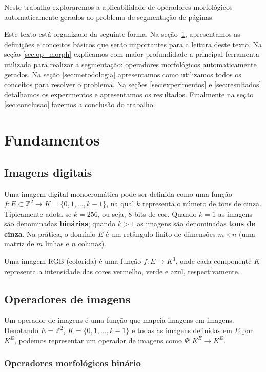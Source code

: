 \documentclass[a4paper,11pt]{article}
\begin{document}
Neste trabalho exploraremos a aplicabilidade de operadores
morfológicos automaticamente gerados ao problema de segmentação de
páginas.

Este texto está organizado da seguinte forma. Na seção~\ref{sec:fundamentos},
apresentamos as definições e conceitos básicos que serão importantes
para a leitura deste texto. Na seção \ref{sec:op_morph} explicamos com maior profundidade a principal ferramenta utilizada para realizar a segmentação: operadores morfológicos automaticamente gerados. Na seção \ref{sec:metodologia} apresentamos como utilizamos todos os conceitos para resolver o problema. Na seções \ref{sec:experimentos} e \ref{sec:resultados} detalhamos os experimentos e apresentamos os resultados. Finalmente na seção \ref{sec:conclusao} fazemos a conclusão do trabalho.

\clearpage

\section{Fundamentos}
\label{sec:fundamentos}

\subsection{Imagens digitais}
  Uma imagem digital monocromática pode ser definida como uma função $f:
  E \subset \mathbb{Z}^2 \to K = \{0,1,\ldots,k-1\}$, na qual $k$ representa o número de tons de cinza. Tipicamente adota-se $k=256$, ou seja, 8-bits de cor. Quando $k=1$ as imagens são denominadas {\bf binárias}; quando $k>1$ as imagens são denominadas {\bf tons de cinza}. Na prática, o domínio $E$ é um retângulo finito de dimensões $m\times n$ (uma matriz de $m$ linhas e $n$ colunas).

  Uma imagem RGB (colorida) é uma função $f: E \to K^3$, onde cada componente $K$ representa a intensidade das cores vermelho, verde e azul, respectivamente.

\subsection{Operadores de imagens}
Um operador de imagens é uma função que mapeia imagens em
imagens. Denotando $E=\mathbb{Z}^2$, $K=\{0,1,\ldots,k-1\}$ e
todas as imagens definidas em $E$ por $K^{E}$,
  podemos representar um operador de imagens como $\Psi: K^{E}
    \to K^{E}$.

  \subsubsection{Operadores morfológicos binário}
\end{document}
